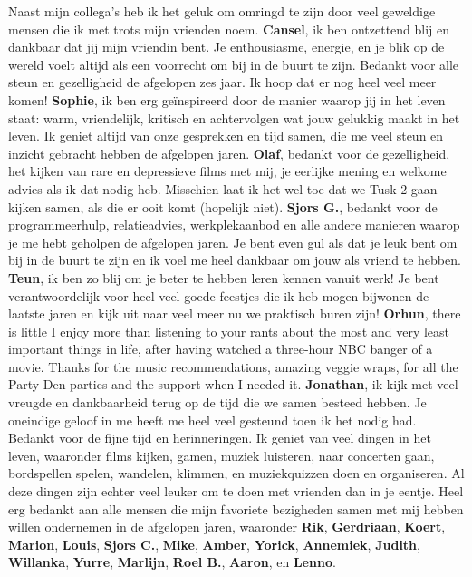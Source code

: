 Naast mijn collega's heb ik het geluk om omringd te zijn door veel geweldige mensen die ik met trots mijn vrienden noem. \newline
\textbf{Cansel}, ik ben ontzettend blij en dankbaar dat jij mijn vriendin bent. Je enthousiasme, energie, en je blik op de wereld voelt altijd als een voorrecht om bij in de buurt te zijn. Bedankt voor alle steun en gezelligheid de afgelopen zes jaar. Ik hoop dat er nog heel veel meer komen! \newline 
\textbf{Sophie}, ik ben erg ge\"{i}nspireerd door de manier waarop jij in het leven staat: warm, vriendelijk, kritisch en achtervolgen wat jouw gelukkig maakt in het leven. Ik geniet altijd van onze gesprekken en tijd samen, die me veel steun en inzicht gebracht hebben de afgelopen jaren. \newline 
\textbf{Olaf}, bedankt voor de gezelligheid, het kijken van rare en depressieve films met mij, je eerlijke mening en welkome advies als ik dat nodig heb. Misschien laat ik het wel toe dat we Tusk 2 gaan kijken samen, als die er ooit komt (hopelijk niet). \newline
\textbf{Sjors G.}, bedankt voor de programmeerhulp, relatieadvies, werkplekaanbod en alle andere manieren waarop je me hebt geholpen de afgelopen jaren. Je bent even gul als dat je leuk bent om bij in de buurt te zijn en ik voel me heel dankbaar om jouw als vriend te hebben. \newline 
\textbf{Teun}, ik ben zo blij om je beter te hebben leren kennen vanuit werk! Je bent verantwoordelijk voor heel veel goede feestjes die ik heb mogen bijwonen de laatste jaren en kijk uit naar veel meer nu we praktisch buren zijn! \newline
\textbf{Orhun}, there is little I enjoy more than listening to your rants about the most and very least important things in life, after having watched a three-hour NBC banger of a movie. Thanks for the music recommendations, amazing veggie wraps, for all the Party Den parties and the support when I needed it. \newline 
\textbf{Jonathan}, ik kijk met veel vreugde en dankbaarheid terug op de tijd die we samen besteed hebben. Je oneindige geloof in me heeft me heel veel gesteund toen ik het nodig had. Bedankt voor de fijne tijd en herinneringen. \newline 
Ik geniet van veel dingen in het leven, waaronder films kijken, gamen, muziek luisteren, naar concerten gaan, bordspellen spelen, wandelen, klimmen, en muziekquizzen doen en organiseren. Al deze dingen zijn echter veel leuker om te doen met vrienden dan in je eentje. Heel erg bedankt aan alle mensen die mijn favoriete bezigheden samen met mij hebben willen ondernemen in de afgelopen jaren, waaronder \textbf{Rik}, \textbf{Gerdriaan}, \textbf{Koert}, \textbf{Marion}, \textbf{Louis}, \textbf{Sjors C.}, \textbf{Mike}, \textbf{Amber}, \textbf{Yorick}, \textbf{Annemiek}, \textbf{Judith}, \textbf{Willanka}, \textbf{Yurre}, \textbf{Marlijn}, \textbf{Roel B.}, \textbf{Aaron}, en \textbf{Lenno}. \newline
